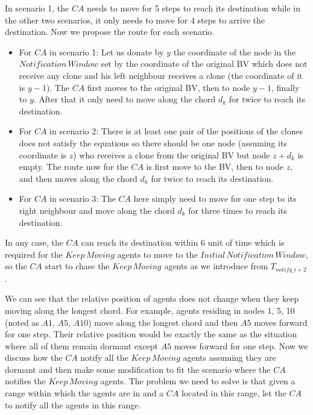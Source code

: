 In scenario 1, the $CA$ needs to move for 5 steps to reach its destination while in the other two scenarios, it only needs to move for 4 steps to arrive the destination. Now we propose the route for each scenario.
\begin{itemize}
\item For $CA$ in scenario 1: Let us donate by $y$ the coordinate of the node in the $Notification\,Window$ set by the coordinate of the original BV which does not receive any clone and his left neighbour receives a clone (the coordinate of it is $y-1$). The $CA$ first moves to the original BV, then to node $y-1$, finally to $y$. After that it only need to move along the chord $d_k$ for twice to reach its destination.
\item For $CA$ in scenario 2: There is at least one pair of the positions of the clones does not satisfy the equations so there should be one node (assuming its coordinate is $z$) who receives a clone from the original BV but node $z+d_k$ is empty. The route now for the $CA$ is first move to the BV, then to node $z$, and then moves along the chord $d_k$ for twice to reach its destination.
\item For $CA$ in scenario 3: The $CA$ here simply need to move for one step to its right neighbour and move along the chord $d_k$ for three times to reach its destination.
\end{itemize}

In any case, the $CA$ can reach its destination within 6 unit of time which is required for the $Keep\,Moving$ agents to move to the $Initial\,Notification\,Window$, so the $CA$ start to chase the $Keep\,Moving$ agents as we introduce from $T_{notify\_{i+2}}$. 










We can see that the relative position of agents does not change when they keep moving along the longest chord. 
For example, agents residing in nodes 1, 5, 10 (noted as $A1$, $A5$, $A10$) move along the longest chord and then $A5$ moves forward for one step. Their relative position  would be exactly the same as the situation where all of them remain dormant except $A5$ moves forward for one step. 
Now we discuss how the $CA$ notify all the $Keep\,Moving$ agents assuming they are dormant and then make some modification to fit the scenario where the $CA$ notifies the $Keep\,Moving$ agents. The problem we need to solve is that given a range within which the agents are in and a $CA$ located in this range, let the $CA$ to notify all the agents in this range. 




